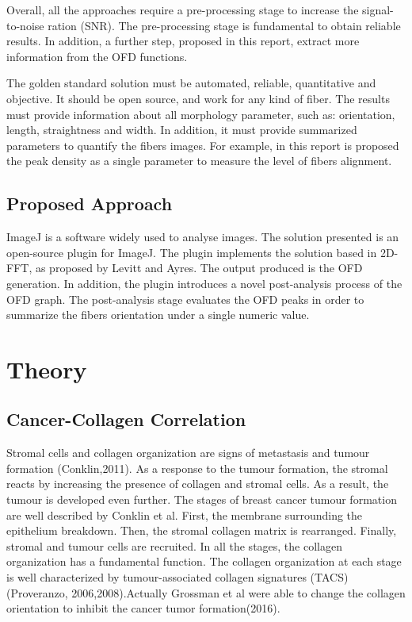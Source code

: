 \documentclass[12pt,a4paper]{article}
\begin{document}
Overall, all the approaches require a pre-processing stage to increase the signal-to-noise ration (SNR). The pre-processing stage is fundamental to obtain reliable results. In addition, a further step, proposed in this report,  extract more information from the  OFD functions.

The golden standard solution must be automated, reliable, quantitative and objective. It should be open source, and work for any kind of fiber.  The results must provide information about all morphology parameter, such as: orientation, length, straightness and width. In addition, it must provide summarized parameters to quantify the fibers images. For example, in this report is proposed the peak density as a single parameter to measure the level of fibers alignment.
\subsection{Proposed Approach}
ImageJ is a software widely used to analyse images. The solution presented is an open-source plugin for ImageJ.  The plugin implements the solution based in 2D-FFT, as proposed by Levitt and Ayres.  The output produced is the OFD generation. In addition, the plugin introduces a novel post-analysis process of the OFD graph. The post-analysis stage evaluates the OFD peaks in order to summarize the fibers orientation under a single numeric value.
\section{Theory}
\subsection{Cancer-Collagen Correlation}
Stromal cells and collagen organization are signs of metastasis and tumour formation (Conklin,2011). As a response to the tumour formation, the stromal reacts by increasing the presence of collagen and stromal cells. As a result, the tumour is developed even further.  The stages of breast cancer tumour formation are well described by Conklin et al. First, the membrane surrounding the epithelium breakdown. Then, the stromal collagen matrix is rearranged. Finally, stromal and tumour cells are recruited. In all the stages, the collagen organization has a fundamental function. The collagen organization at each stage is well characterized by tumour-associated collagen signatures (TACS) (Proveranzo, 2006,2008).Actually Grossman et al were able to change the collagen orientation to inhibit the cancer tumor formation(2016).
\end{document}
